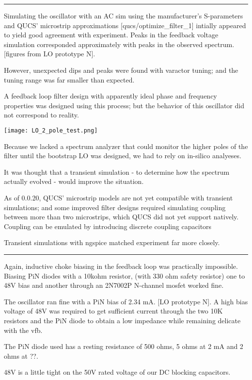 \documentclass[fleqn,10pt]{article}
\begin{document}
\begin{multicols}{1}
\rule{\linewidth}{0.2pt}

Simulating the oscillator with an AC sim using the manufacturer's S-parameters and QUCS' microstrip approximations [qucs/optimize\_filter\_1] intially appeared to yield good agreement with experiment. Peaks in the feedback voltage simulation corresponded approximately with peaks in the observed spectrum. [figures from LO prototype N]. 
 
However, unexpected dips and peaks were found with varactor tuning; and the tuning range was far smaller than expected.

A feedback loop filter design with apparently ideal phase and frequency properties was designed using this process; but the behavior of this oscillator did not correspond to reality. 

\hspace*{-0.7cm}   \texttt{[image: LO\_2\_pole\_test.png]}

Because we lacked a spectrum analyzer that could monitor the higher poles of the filter until the bootstrap LO was designed, we had to rely on in-silico analyeses.

It was thought that a transient simulation - to determine how the spectrum actually evolved - would improve the situation. 

As of 0.0.20, QUCS' microstrip models are not yet compatible with transient simulations; and some improved filter designs required simulating coupling between more than two microstrips, which QUCS did not yet support natively. Coupling can be emulated by introducing discrete coupling capacitors

Transient simulations with ngspice matched experiment far more closely.

\rule{\linewidth}{0.2pt}

Again, inductive choke biasing in the feedback loop was practically impossible. Biasing PiN diodes with a 10kohm resistor, (with 330 ohm safety resistor) one to 48V bias and another through an 2N7002P N-channel mosfet worked fine. 

The oscillator ran fine with a PiN bias of 2.34 mA. [LO prototype N]. A high bias voltage of 48V was required to get sufficient current through the two 10K resistors and the PiN diode to obtain a low impedance while remaining delicate with the vfb.

The PiN diode used has a resting resistance of 500 ohms, 5 ohms at 2 mA and 2 ohms at ??. 

48V is a little tight on the 50V rated voltage of our DC blocking capacitors.


\end{multicols}
\end{document}
